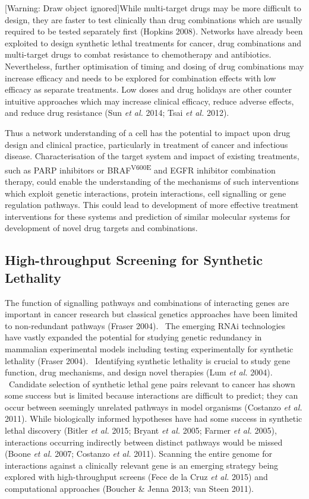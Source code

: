[Warning: Draw object ignored]While multi-target drugs may be more
difficult to design, they are faster to test clinically than drug
combinations which are usually required to be tested separately first
(Hopkins 2008). Networks have already been exploited to design
synthetic lethal treatments for cancer, drug combinations and
multi-target drugs to combat resistance to chemotherapy and
antibiotics. Nevertheless, further optimisation of timing and dosing
of drug combinations may increase efficacy and needs to be explored for
combination effects with low efficacy as separate treatments. Low
doses and drug holidays are other counter intuitive approaches which
may increase clinical efficacy, reduce adverse effects, and reduce drug
resistance (Sun\textit{ et al.} 2014; Tsai\textit{ et al.} 2012). 


Thus a network understanding of a cell has the potential to impact upon
drug design and clinical practice, particularly in treatment of cancer
and infectious disease. Characterisation of the target system and
impact of existing treatments, such as PARP inhibitors or
BRAF\textsuperscript{V600E} and EGFR inhibitor combination therapy,
could enable the understanding of the mechanisms of such interventions
which exploit genetic interactions, protein interactions, cell
signalling or gene regulation pathways. This could lead to
development of more effective treatment interventions for these systems
and prediction of similar molecular systems for development of novel
drug targets and combinations. 


\subsection[High{}-throughput Screening for Synthetic
Lethality]{High-throughput Screening for Synthetic Lethality}

The function of signalling pathways and combinations of interacting
genes are important in cancer research but classical genetics
approaches have been limited to non-redundant pathways (Fraser 2004).
\ The emerging RNAi technologies have vastly expanded the potential for
studying genetic redundancy in mammalian experimental models including
testing experimentally for synthetic lethality (Fraser 2004).
\ Identifying synthetic lethality is crucial to study gene function,
drug mechanisms, and design novel therapies (Lum\textit{ et al.} 2004).
\ Candidate selection of synthetic lethal gene pairs relevant to cancer
has shown some success but is limited because interactions are
difficult to predict; they can occur between seemingly unrelated
pathways in model organisms (Costanzo\textit{ et al.} 2011). While
biologically informed hypotheses have had some success in synthetic
lethal discovery (Bitler\textit{ et al.} 2015; Bryant\textit{ et al.}
2005; Farmer\textit{ et al.} 2005), interactions occurring indirectly
between distinct pathways would be missed (Boone\textit{ et al.} 2007;
Costanzo\textit{ et al.} 2011). Scanning the entire genome for
interactions against a clinically relevant gene is an emerging strategy
being explored with high-throughput screens (Fece de la Cruz\textit{ et
al.} 2015) and computational approaches (Boucher \& Jenna 2013; van
Steen 2011). 


